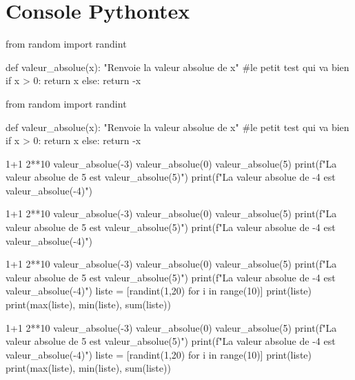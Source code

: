 \documentclass[french,a4paper,10pt]{article}
\begin{document}
\section{Console \og Pythontex \fg{}}

{\small \begin{codehigh}
\begin{pyconcode}
from random import randint

def valeur_absolue(x):
    "Renvoie la valeur absolue de x"
    #le petit test qui va bien
    if x > 0:
        return x
    else:
        return -x

\end{pyconcode}
\end{codehigh}}

\begin{pyconcode}
from random import randint

def valeur_absolue(x):
	"Renvoie la valeur absolue de x"
	#le petit test qui va bien
	if x > 0:
		return x
	else:
		return -x

\end{pyconcode}

{\small \begin{codehigh}
\begin{ConsolePythontex}{}
1+1
2**10
valeur_absolue(-3)
valeur_absolue(0)
valeur_absolue(5)
print(f"La valeur absolue de 5 est {valeur_absolue(5)}")
print(f"La valeur absolue de -4 est {valeur_absolue(-4)}")
\end{ConsolePythontex}
\end{codehigh}}

\begin{ConsolePythontex}{}
1+1
2**10
valeur_absolue(-3)
valeur_absolue(0)
valeur_absolue(5)
print(f"La valeur absolue de 5 est {valeur_absolue(5)}")
print(f"La valeur absolue de -4 est {valeur_absolue(-4)}")
\end{ConsolePythontex}

\pagebreak

{\small \begin{codehigh}
\begin{ConsolePythontex}[Largeur=12cm,Centre]{}
1+1
2**10
valeur_absolue(-3)
valeur_absolue(0)
valeur_absolue(5)
print(f"La valeur absolue de 5 est {valeur_absolue(5)}")
print(f"La valeur absolue de -4 est {valeur_absolue(-4)}")
liste = [randint(1,20) for i in range(10)]
print(liste)
print(max(liste), min(liste), sum(liste))
\end{ConsolePythontex}
\end{codehigh}}

\begin{ConsolePythontex}[Largeur=12cm,Centre]{}
1+1
2**10
valeur_absolue(-3)
valeur_absolue(0)
valeur_absolue(5)
print(f"La valeur absolue de 5 est {valeur_absolue(5)}")
print(f"La valeur absolue de -4 est {valeur_absolue(-4)}")
liste = [randint(1,20) for i in range(10)]
print(liste)
print(max(liste), min(liste), sum(liste))
\end{ConsolePythontex}
\end{document}
